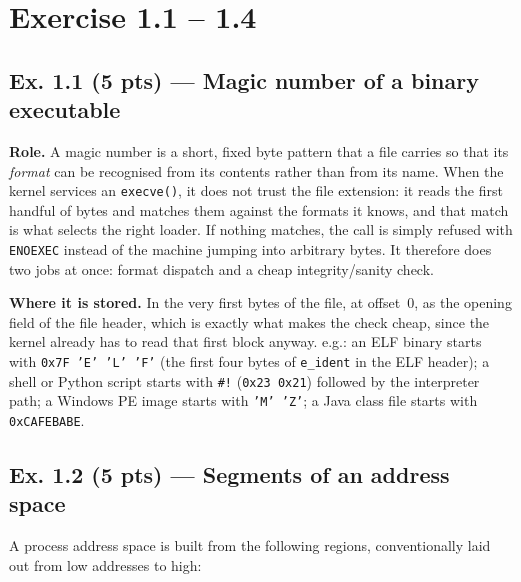 \section*{Exercise 1.1 -- 1.4}
\label{p1:sec:main}

\subsection*{Ex. 1.1 (5 pts) --- Magic number of a binary executable}
\label{p1:sec:magic}

\textbf{Role.} A magic number is a short, fixed byte pattern that a file carries so
that its \emph{format} can be recognised from its contents rather than from its name.
When the kernel services an \texttt{execve()}, it does not trust the file extension: it
reads the first handful of bytes and matches them against the formats it knows, and that
match is what selects the right loader. If nothing matches, the call is simply refused with \texttt{ENOEXEC}
instead of the machine jumping into arbitrary bytes. It therefore does two jobs at once:
format dispatch and a cheap integrity/sanity check.

\textbf{Where it is stored.} In the very first bytes of the file, at offset~0, as the
opening field of the file header, which is exactly what makes the check cheap, since
the kernel already has to read that first block anyway. e.g.: an ELF binary starts
with \texttt{0x7F 'E' 'L' 'F'} (the first four bytes of \texttt{e\_ident} in the ELF
header); a shell or Python script starts with \texttt{\#!} (\texttt{0x23 0x21}) followed
by the interpreter path; a Windows PE image starts with \texttt{'M' 'Z'}; a Java class
file starts with \texttt{0xCAFEBABE}.

\subsection*{Ex. 1.2 (5 pts) --- Segments of an address space}
\label{p1:sec:segments}

A process address space is built from the following regions, conventionally laid out from
low addresses to high:

